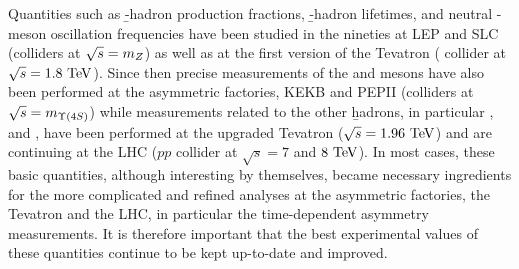 %
%
%
%

%







Quantities such as \b-hadron production fractions, \b-hadron lifetimes, 
and neutral \B-meson oscillation frequencies have been studied
in the nineties at LEP and SLC %
(\ee colliders at $\sqrt{s}=m_{Z}$) 
as well as at the 
first version of the Tevatron
( collider at $\sqrt{s}=1.8~\rm TeV$). 
Since then 
precise measurements of the \Bd and \Bu mesons
have also been performed at the 
asymmetric \B factories, KEKB and PEPII
(\ee colliders at $\sqrt{s}=m_{\Upsilon(4S)}$) while measurements related 
to the other \b hadrons, in particular \Bs, \Bc and \Lb, 
have been performed at the upgraded Tevatron ($\sqrt{s}=1.96~\rm TeV$)
and are continuing at the LHC ($pp$ collider at $\sqrt{s}=7$ and $8~\rm TeV$).
In most cases, these basic quantities, although interesting by themselves,
became necessary ingredients for the more complicated and 
refined analyses at the asymmetric \B factories, 
the Tevatron and the LHC,
in particular the time-dependent \CP asymmetry measurements.
It is therefore important that the best experimental
values of these quantities continue to be kept up-to-date and improved. 

